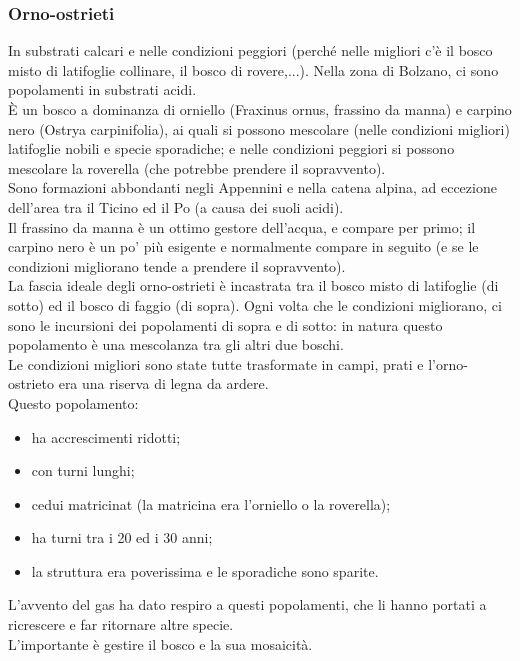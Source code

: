 \subsubsection{Orno-ostrieti}
In substrati calcari e nelle condizioni peggiori (perché nelle migliori c'è il bosco misto di latifoglie collinare, il bosco di rovere,...). Nella zona di Bolzano, ci sono popolamenti in substrati acidi.\\
È un bosco a dominanza di orniello (Fraxinus ornus, frassino da manna) e carpino nero (Ostrya carpinifolia), ai quali si possono mescolare (nelle condizioni migliori) latifoglie nobili e specie sporadiche; e nelle condizioni peggiori si possono mescolare la roverella (che potrebbe prendere il sopravvento).\\
Sono formazioni abbondanti negli Appennini e nella catena alpina, ad eccezione dell'area tra il Ticino ed il Po (a causa dei suoli acidi).\\
Il frassino da manna è un ottimo gestore dell'acqua, e compare per primo; il carpino nero è un po' più esigente e normalmente compare in seguito (e se le condizioni migliorano tende a prendere il sopravvento).\\
La fascia ideale degli orno-ostrieti è incastrata tra il bosco misto di latifoglie (di sotto) ed il bosco di faggio (di sopra). Ogni volta che le condizioni migliorano, ci sono le incursioni dei popolamenti di sopra e di sotto: in natura questo popolamento è una mescolanza tra gli altri due boschi.\\
Le condizioni migliori sono state tutte trasformate in campi, prati e l'orno-ostrieto era una riserva di legna da ardere.\\
Questo popolamento:
\begin{itemize}[nosep]
    \item ha accrescimenti ridotti;
    \item con turni lunghi;
    \item cedui matricinat (la matricina era l'orniello o la roverella);
    \item ha turni tra i 20 ed i 30 anni;
    \item la struttura era poverissima e le sporadiche sono sparite.
\end{itemize}
L'avvento del gas ha dato respiro a questi popolamenti, che li hanno portati a ricrescere e far ritornare altre specie.\\
L'importante è gestire il bosco e la sua mosaicità.  
